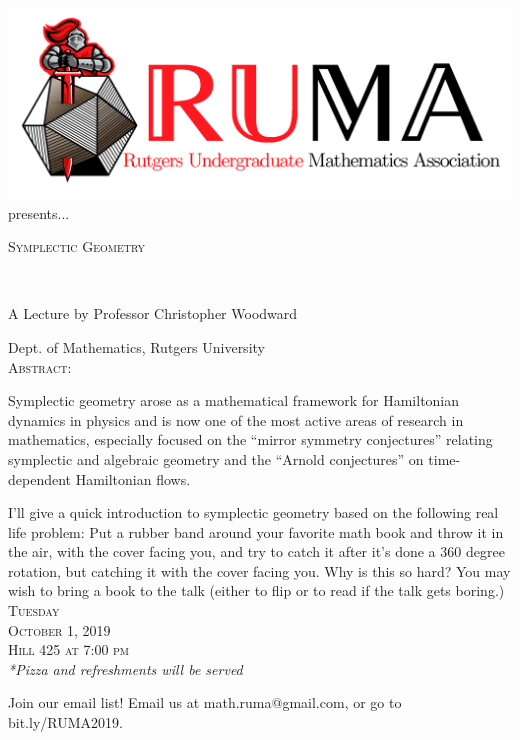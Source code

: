 \documentclass[12pt]{article}
\begin{document}

\begin{center}\includegraphics[scale=.35]{RUMAlogo.png}\\
presents... \\
\begin{spacing}{1}
{\fontsize{40}{44}\selectfont  \textsc{
Symplectic Geometry}} \end{spacing}
 

~~\\
\begin{spacing}{1.5}
{\fontsize{24}{24} \selectfont A Lecture by Professor Christopher
  Woodward}  \end{spacing} 
\large Dept. of Mathematics, Rutgers University \\

\vspace{5mm}
\normalsize
\textsc{Abstract:}

\Large 
Symplectic geometry arose as a mathematical framework 
for Hamiltonian dynamics in physics and is now one of the most
active areas of research in mathematics, especially focused on the
``mirror symmetry
conjectures'' relating symplectic and algebraic geometry and the ``Arnold conjectures''
on time-dependent Hamiltonian flows.

\vspace{2mm}
I'll give a quick introduction to symplectic geometry based on the following 
real life problem:  Put a rubber band around your favorite math book 
and throw it in the air, with the cover facing you, and try to catch
it after it's done a 360 degree rotation, but catching it with the cover
facing you. Why is this so hard?  You may wish to bring a book to the talk (either to flip or to read if the talk gets boring.)\\

\vspace{5mm} 
\huge   \textsc{Tuesday\\October 1, 2019 \\Hill 425 at 7:00 pm}
\\

\vspace{5mm}
\large
\emph{*Pizza and refreshments will be served}
\end{center}
\begin{center}
  \large  Join our email list! Email us at math.ruma@gmail.com, or
go to bit.ly/RUMA2019.\\
\end{center}
\end{document}

